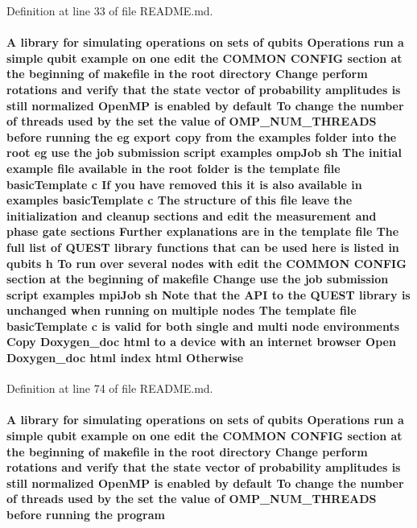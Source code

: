 Definition at line 33 of file README.md.\hypertarget{README_8md_a1609f0bb178c72f20123669240bf1831}{
\paragraph[{Otherwise}]{\setlength{\rightskip}{0pt plus 5cm}A library for simulating operations on sets of qubits Operations run a simple qubit example on one edit the COMMON CONFIG section at the beginning of makefile in the root directory Change perform {\bf rotations} and verify that the state vector of probability amplitudes {\bf is} still normalized OpenMP {\bf is} enabled by default To change the number of threads used by the set the value of {\bf OMP\_\-NUM\_\-THREADS} before running the {\bf eg} export copy from the examples {\bf folder} into the root {\bf eg} use the job submission script examples ompJob sh The initial example {\bf file} available in the root {\bf folder} {\bf is} the template {\bf file} basicTemplate c If you have removed this it {\bf is} also available in examples basicTemplate c The structure of this {\bf file} leave the initialization and cleanup sections and edit the measurement and phase gate sections Further explanations are in the template {\bf file} The full list of QUEST library functions that can be used here {\bf is} listed in qubits h To run over several nodes with edit the COMMON CONFIG section at the beginning of makefile Change use the job submission script examples mpiJob sh Note that the API to the QUEST library {\bf is} unchanged when running on multiple nodes The template {\bf file} basicTemplate c {\bf is} valid for both single and multi {\bf node} environments Copy Doxygen\_\-doc html to a device with an internet browser Open Doxygen\_\-doc html index html {\bf Otherwise}}\hfill}
\label{README_8md_a1609f0bb178c72f20123669240bf1831}


Definition at line 74 of file README.md.\hypertarget{README_8md_acaf0a093d3b37b72f96f5ff7416daa2c}{
\paragraph[{program}]{\setlength{\rightskip}{0pt plus 5cm}A library for simulating operations on sets of qubits Operations run a simple qubit example on one edit the COMMON CONFIG section at the beginning of makefile in the root directory Change perform {\bf rotations} and verify that the state vector of probability amplitudes {\bf is} still normalized OpenMP {\bf is} enabled by default To change the number of threads used by the set the value of {\bf OMP\_\-NUM\_\-THREADS} before running the {\bf program}}\hfill}
\label{README_8md_acaf0a093d3b37b72f96f5ff7416daa2c}


